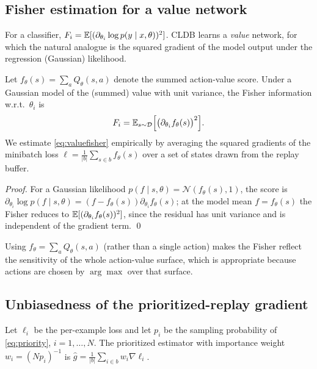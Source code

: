 \subsection{Fisher estimation for a value network}
For a classifier, \(F_i=\mathbb{E}[(\partial_{\theta_i}\log p(y\mid x,\theta))^2]\).
CLDB learns a \emph{value} network, for which the natural analogue is the
squared gradient of the model output under the regression (Gaussian) likelihood.

\begin{proposition}
\label{prop:fisher}
Let \(f_\theta(s)=\sum_{a}Q_\theta(s,a)\) denote the summed action-value score.
Under a Gaussian model of the (summed) value with unit variance, the Fisher
information w.r.t.\ \(\theta_i\) is
\begin{equation}
  F_i = \mathbb{E}_{s\sim\mathcal{D}}\Big[\big(\partial_{\theta_i} f_\theta(s)\big)^2\Big].
  \label{eq:valuefisher}
\end{equation}
We estimate \eqref{eq:valuefisher} empirically by averaging the squared gradients
of the minibatch loss \(\ell=\frac{1}{|b|}\sum_{s\in b} f_\theta(s)\) over a
set of states drawn from the replay buffer.
\end{proposition}
\begin{proof}
For a Gaussian likelihood \(p(f\mid s,\theta)=\mathcal{N}(f_\theta(s),1)\), the
score is \(\partial_{\theta_i}\log p(f\mid s,\theta)=(f-f_\theta(s))
\partial_{\theta_i}f_\theta(s)\); at the model mean \(f=f_\theta(s)\) the Fisher
reduces to \(\mathbb{E}[(\partial_{\theta_i}f_\theta(s))^2]\), since the residual has unit
variance and is independent of the gradient term. \qed
\end{proof}
Using \(f_\theta=\sum_a Q_\theta(s,a)\) (rather than a single action) makes the
Fisher reflect the sensitivity of the whole action-value surface, which is
appropriate because actions are chosen by \(\arg\max\) over that surface.

\subsection{Unbiasedness of the prioritized-replay gradient}
Let \(\ell_i\) be the per-example loss and let \(p_i\) be the sampling
probability of \eqref{eq:priority}, \(i=1,\dots,N\). The prioritized estimator
with importance weight \(w_i = (N p_i)^{-1}\) is
\(\hat g = \frac{1}{|b|}\sum_{i\in b} w_i \nabla\ell_i\).

